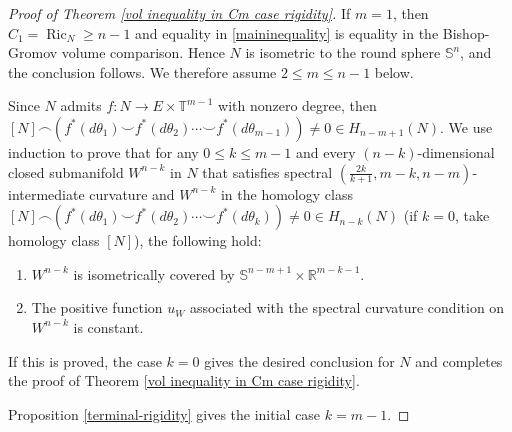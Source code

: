\documentclass[11pt]{amsart}
\DeclareMathOperator{\Ric}{Ric}
\theoremstyle{definition}
\theoremstyle{remark}
\numberwithin{equation}{section}
\begin{document}
\begin{proof}[Proof of Theorem \ref{vol inequality in Cm case rigidity}]
If $m=1$, then $C_1=\Ric_N\geq n-1$ and equality in \eqref{maininequality} is equality in the
  Bishop-Gromov volume comparison. Hence $N$ is isometric to the round sphere $\mathbb{S}^n$, and
  the conclusion follows. We therefore assume $2\leq m\leq n-1$ below.
  
Since $N$ admits $f:N\rightarrow E\times \mathbb{T}^{m-1}$ with nonzero degree, then $[N]\frown (f^{*}(d\theta_{1})\smile f^{*}(d\theta_{2}) \cdots \smile f^{*}(d\theta_{m-1}))\neq 0\in H_{n-m+1}(N)$.
We use induction to prove that for any $0 \leq k\leq m-1$ and
    every $(n-k)$-dimensional closed submanifold $W^{n-k}$ in $N$ that satisfies 
    spectral $(\frac{2k}{k+1},m-k,n-m)$-intermediate curvature and $W^{n-k}$ in the homology class $[N]\frown (f^{*}(d\theta_{1})\smile f^{*}(d\theta_{2}) \cdots \smile f^{*}(d\theta_{k}))\neq 0\in H_{n-k}(N)$ (if $k=0$, take homology class $[N]$), the following
    hold:
    \begin{enumerate}[label=(\roman*)]
        \item $W^{n-k}$ is isometrically covered by
          $\mathbb{S}^{n-m+1}\times\mathbb{R}^{m-k-1}$.
        \item The positive function $u_W$ associated with the spectral curvature condition on $W^{n-k}$ is constant.
    \end{enumerate}

 If this is proved, the case $k=0$ gives the desired conclusion for $N$ and completes the proof
   of Theorem \ref{vol inequality in Cm case rigidity}.

Proposition \ref{terminal-rigidity} gives the initial case $k=m-1$.


\end{proof}
\end{document}
